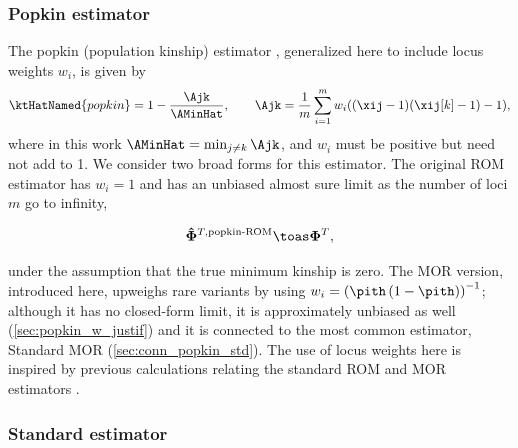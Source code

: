 \documentclass[11pt]{article}
\newcommand{\kinMat}[1][T]{%
  \ensuremath{%
    \mathbf{\Phi}^{#1}
  }%
  \xspace%
}%
\newcommand{\kinMatEstNamed}[1]{%
  \ensuremath{%
    \mathbf{\hat{\Phi}}^{T,\text{#1}}
  }%
  \xspace%
}%
\begin{document}
\begin{linenumbers}
\subsubsection{Popkin estimator}

The popkin (population kinship) estimator \citep{ochoa_estimating_2021}, generalized here to include locus weights $w_i$, is given by
\begin{equation}
  \label{eq:popkin}
  \ktHatNamed{popkin}
  =
  1 - \frac{\Ajk}{\AMinHat}
  , \quad\quad
  \Ajk
  =
  \frac{1}{m} \sum_{i=1}^m w_i ( (\xij-1)(\xij[k]-1) - 1 )
  ,
\end{equation}
where in this work $\AMinHat = \min_{j \ne k} \Ajk$, and $w_i$ must be positive but need not add to 1.
We consider two broad forms for this estimator.
The original ROM estimator has $w_i = 1$ and has an unbiased almost sure limit as the number of loci $m$ go to infinity,
\begin{linenomath*}
$$
\kinMatEstNamed{popkin-ROM} \toas \kinMat,
$$
\end{linenomath*}
under the assumption that the true minimum kinship is zero.
The MOR version, introduced here, upweighs rare variants by using $w_i = \left( \pith \left( 1 - \pith \right) \right)^{-1}$; although it has no closed-form limit, it is approximately unbiased as well (\cref{sec:popkin_w_justif}) and it is connected to the most common estimator, Standard MOR (\cref{sec:conn_popkin_std}). 
The use of locus weights here is inspired by previous calculations relating the standard ROM and MOR estimators \citep{wang_efficient_2017}.

\subsubsection{Standard estimator}


\end{linenumbers}
\end{document}
